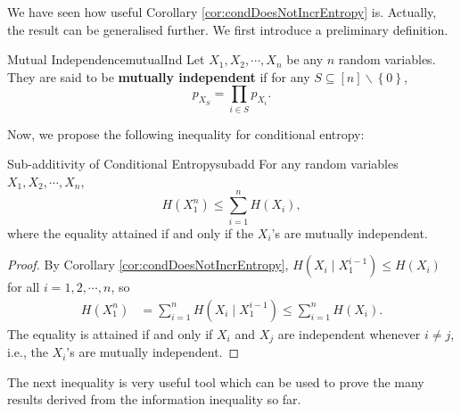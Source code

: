 \documentclass[math]{amznotes}
\theoremstyle{remark}
\begin{document}
We have seen how useful Corollary \ref{cor:condDoesNotIncrEntropy} is. Actually, the result can be generalised further. We first introduce a preliminary definition.
\begin{dfnbox}{Mutual Independence}{mutualInd}
    Let $X_1, X_2, \cdots, X_n$ be any $n$ random variables. They are said to be {\color{red} \textbf{mutually independent}} if for any $S \subseteq \left[n\right] \backslash \left\{0\right\}$, 
    \begin{equation*}
        p_{X_S} = \prod_{i \in S}p_{X_i}.
    \end{equation*}
\end{dfnbox}
Now, we propose the following inequality for conditional entropy:
\begin{corbox}{Sub-additivity of Conditional Entropy}{subadd}
    For any random variables $X_1, X_2, \cdots, X_n$,
    \begin{equation*}
        H\left(X_1^n\right) \leq \sum_{i = 1}^{n}H\left(X_i\right),
    \end{equation*}
    where the equality attained if and only if the $X_i$'s are mutually independent.
    \tcblower
    \begin{proof}
        By Corollary \ref{cor:condDoesNotIncrEntropy}, $H\left(X_i \mid X_1^{i - 1}\right) \leq H\left(X_i\right)$ for all $i = 1, 2, \cdots, n$, so
        \begin{align*}
            H\left(X_1^n\right) & = \sum_{i = 1}^nH\left(X_i \mid X_1^{i - 1}\right)  \leq \sum_{i = 1}^{n}H\left(X_i\right).
        \end{align*}
        The equality is attained if and only if $X_i$ and $X_j$ are independent whenever $i \neq j$, i.e., the $X_i$'s are mutually independent.
    \end{proof}
\end{corbox}
The next inequality is very useful tool which can be used to prove the many results derived from the information inequality so far.
\end{document}
